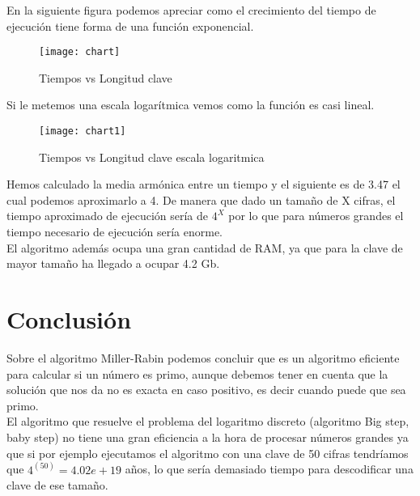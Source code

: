 En la siguiente figura podemos apreciar como el crecimiento del tiempo de ejecución tiene forma de una función exponencial.\\

\begin{figure}[H]
	\begin{center}
		\texttt{[image: chart]}
		\caption{Tiempos vs Longitud clave}
		\label{figura: tiempos}
	\end{center}
\end{figure}

Si le metemos una escala logarítmica vemos como la función es casi lineal.
\begin{figure}[H]
	\begin{center}
		\texttt{[image: chart1]}
		\caption{Tiempos vs Longitud clave escala logaritmica}
		\label{figura: tiempos2}
	\end{center}
\end{figure}



Hemos calculado la media armónica entre un tiempo y el siguiente es de 3.47 el cual podemos aproximarlo a 4. De manera que dado un tamaño de X cifras, el tiempo aproximado de ejecución sería de $4^X$ por lo que para números grandes el tiempo necesario de ejecución sería enorme.\\

El algoritmo además ocupa una gran cantidad de RAM, ya que para la clave de mayor tamaño ha llegado a ocupar 4.2 Gb.\\

\section{Conclusión}

Sobre el algoritmo Miller-Rabin podemos concluir que es un algoritmo eficiente para calcular si un número es primo, aunque debemos tener en cuenta que la solución que nos da no es exacta en caso positivo, es decir cuando puede que sea primo. \\

El algoritmo que resuelve el problema del logaritmo discreto (algoritmo Big step, baby step) no tiene una gran eficiencia a la hora de procesar números grandes ya que si por ejemplo ejecutamos el algoritmo con una clave de 50 cifras tendríamos que $4^(50) = 4.02 e+19$ años, lo que sería demasiado tiempo para descodificar una clave de ese tamaño.\\

